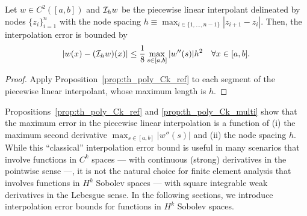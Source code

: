 \begin{proposition}
  \label{prop:th_poly_Ck_multi}
  Let $w \in C^2([a,b])$ and $\mathcal{I}_h w$ be the piecewise linear interpolant delineated by nodes $\{z_i\}_{i=1}^n$ with the node spacing $h \equiv \max_{i \in \{ 1,\dots,n-1 \} } |z_{i+1} - z_i|$. Then, the interpolation error is bounded by
  \begin{equation*}
    | w(x) - (\mathcal{I}_h w)(x) | \leq \frac{1}{8} \max_{s \in [a,b]} |w''(s)| h^2 \quad \forall x \in [a,b].
  \end{equation*}
  \begin{proof}
    Apply Proposition~\ref{prop:th_poly_Ck_ref} to each segment of the piecewise linear interpolant, whose maximum length is $h$.
  \end{proof}
\end{proposition}
Propositions~\ref{prop:th_poly_Ck_ref} and \ref{prop:th_poly_Ck_multi} show that the maximum error in the piecewise linear interpolation is a function of (i) the maximum second derivative $\max_{s \in [a,b]} | w''(s)|$ and (ii) the node spacing $h$.  While this ``classical'' interpolation error bound is useful in many scenarios that involve functions in $C^k$ spaces --- with continuous (strong) derivatives in the pointwise sense  ---, it is not the natural choice for finite element analysis that involves functions in $H^k$ Sobolev spaces --- with square integrable weak derivatives in the Lebesgue sense.  In the following sections, we introduce interpolation error bounds for functions in $H^k$ Sobolev spaces.

